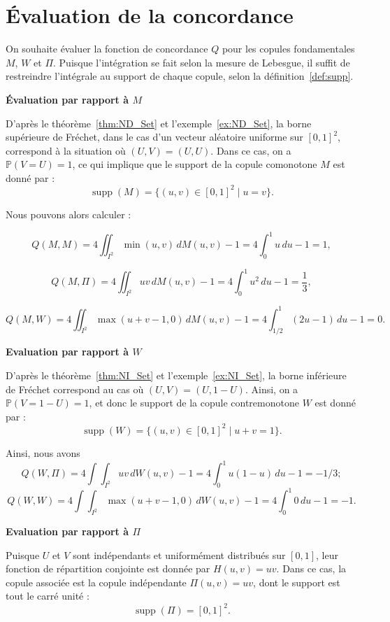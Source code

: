\documentclass[a4paper,11pt]{amsbook}
\numberwithin{equation}{chapter}
\theoremstyle{definition}
\begin{document}
\section{Évaluation de la concordance}
On souhaite évaluer la fonction de concordance \( Q \) pour les copules fondamentales \( M \), \( W \) et \( \Pi \).  
Puisque l'intégration se fait selon la mesure de Lebesgue, il suffit de restreindre l'intégrale au support de chaque copule, selon la définition~\ref{def:supp}.

\textbf{Évaluation par rapport à \( M \)}

D’après le théorème~\ref{thm:ND_Set} et l’exemple~\ref{ex:ND_Set}, la borne supérieure de Fréchet, dans le cas d’un vecteur aléatoire uniforme sur \([0,1]^2\), correspond à la situation où \( (U, V) = (U, U) \).  
Dans ce cas, on a \( \mathbb{P}(V = U) = 1 \), ce qui implique que le support de la copule comonotone \( M \) est donné par :
\[
\operatorname{supp}(M) = \{(u,v) \in [0,1]^2 \mid u = v\}.
\]


Nous pouvons alors calculer :

\[
Q(M,M) = 4 \iint_{I^2} \min(u,v) \, dM(u,v) - 1 = 4 \int_{0}^{1} u \, du - 1 = 1, \tag{1}
\]

\[
Q(M,\Pi) = 4 \iint_{I^2} uv \, dM(u,v) - 1 = 4 \int_{0}^{1} u^2 \, du - 1 = \frac{1}{3}, \tag{2}
\]

\[
Q(M,W) = 4 \iint_{I^2} \max(u+v-1,0) \, dM(u,v) - 1 = 4 \int_{1/2}^{1} (2u-1) \, du - 1 = 0. \tag{3}
\]


\textbf{Evaluation par rapport à \(W\)}

D'après le théorème~\ref{thm:NI_Set} et l'exemple~\ref{ex:NI_Set}, la borne inférieure de Fréchet correspond au cas où \( (U, V) = (U, 1 - U) \).  
Ainsi, on a \( \mathbb{P}(V = 1 - U) = 1 \), et donc le support de la copule contremonotone \( W \) est donné par :
\[
\operatorname{supp}(W) = \{(u,v) \in [0,1]^2 \mid u + v = 1\}.
\]

Ainsi, nous avons
\[
Q(W,\Pi) = 4 \int\int_{I^2} uv \, dW(u,v) -1 = 4 \int_{0}^{1} u(1-u) \, du -1 = -1/3; \tag{4}
\]
\[
Q(W,W) = 4 \int\int_{I^2} \max(u+v-1,0) \, dW(u,v) -1 = 4 \int_{0}^{1} 0 \, du -1 = -1. \tag{5}
\]

\textbf{Evaluation par rapport à \(\Pi\)}

Puisque \( U \) et \( V \) sont indépendants et uniformément distribués sur \([0,1]\), leur fonction de répartition conjointe est donnée par \( H(u,v) = uv \).  
Dans ce cas, la copule associée est la copule indépendante \( \Pi(u,v) = uv \), dont le support est tout le carré unité :
\[
\operatorname{supp}(\Pi) = [0,1]^2.
\]
\end{document}
